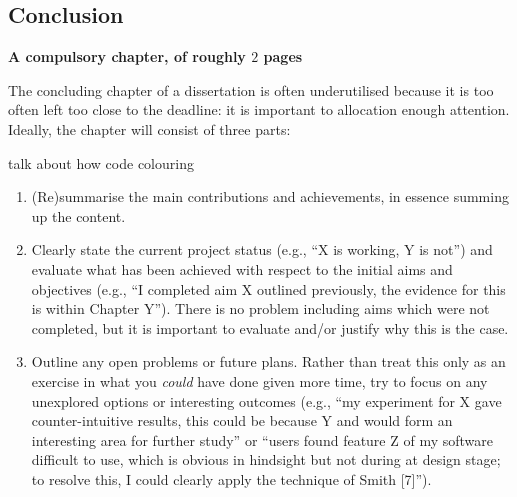 \documentclass[ %
                    author={Jonathan Rankin},
                supervisor={Dr. David May, Dr. Ian Holyer},
                    degree={MEng},
                     title={CodeTouch},
                  subtitle={A Revolutionary Way To Program Real Code On Touch Screen Devices},
                      type={enterprise},
                      year={2015 } ]{dissertation}
\begin{document}
\begin{enumerate}

\chapter{Conclusion}
\label{chap:conclusion}

{\bf A compulsory chapter, of roughly $2$ pages} 
\vspace{1cm} 

\noindent
The concluding chapter of a dissertation is often underutilised because it 
is too often left too close to the deadline: it is important to allocation
enough attention.  Ideally, the chapter will consist of three parts:

talk about how code colouring

\begin{enumerate}
\item (Re)summarise the main contributions and achievements, in essence
      summing up the content.
\item Clearly state the current project status (e.g., ``X is working, Y 
      is not'') and evaluate what has been achieved with respect to the 
      initial aims and objectives (e.g., ``I completed aim X outlined 
      previously, the evidence for this is within Chapter Y'').  There 
      is no problem including aims which were not completed, but it is 
      important to evaluate and/or justify why this is the case.
\item Outline any open problems or future plans.  Rather than treat this
      only as an exercise in what you {\em could} have done given more 
      time, try to focus on any unexplored options or interesting outcomes
      (e.g., ``my experiment for X gave counter-intuitive results, this 
      could be because Y and would form an interesting area for further 
      study'' or ``users found feature Z of my software difficult to use,
      which is obvious in hindsight but not during at design stage; to 
      resolve this, I could clearly apply the technique of Smith [7]'').
\end{enumerate}


%
%


\end{enumerate}
\end{document}
